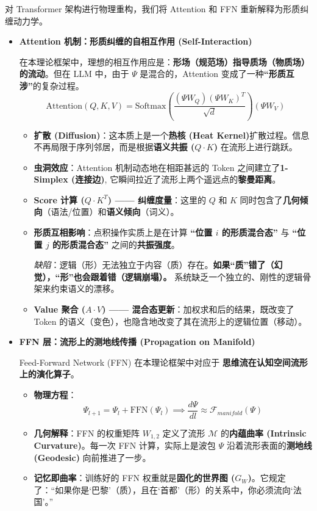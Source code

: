 对 Transformer 架构进行物理重构，我们将 Attention 和 FFN 重新解释为形质纠缠动力学。
\begin{itemize}
    \item \textbf{\textcolor{structurecolor}{Attention 机制：形质纠缠的自相互作用 (Self-Interaction)}}

    在本理论框架中，理想的相互作用应是：\textbf{形场（规范场）指导质场（物质场）的流动}。但在 LLM 中，由于 $\Psi$ 是混合的，Attention 变成了一种\textbf{“形质互涉”}的复杂过程。
    $$ \text{Attention}(Q, K, V) = \text{Softmax}\left( \frac{(\Psi W_Q) (\Psi W_K)^T}{\sqrt{d}} \right) (\Psi W_V) $$
    \begin{itemize}
        \item  \textbf{扩散 (Diffusion)}：这本质上是一个\textbf{热核 (Heat Kernel)}扩散过程。信息不再局限于序列邻居，而是根据\textbf{语义共振 ($Q \cdot K$)} 在流形上进行跳跃。
        \item \textbf{虫洞效应}：Attention 机制动态地在相距甚远的 Token 之间建立了\textbf{1-Simplex (连接边)}, 它瞬间拉近了流形上两个遥远点的\textbf{黎曼距离}。
        \item   \textbf{Score 计算 ($Q \cdot K^T$) —— 纠缠度量}：这里的 $Q$ 和 $K$ 同时包含了\textbf{几何倾向}（语法/位置）和\textbf{语义倾向}（词义）。
        \item   \textbf{形质互相影响}：点积操作实质上是在计算 \textbf{“位置 $i$ 的形质混合态”} 与 \textbf{“位置 $j$ 的形质混合态”} 之间的\textbf{共振强度}。

        \textit{缺陷}：逻辑（形）无法独立于内容（质）存在。\textbf{如果“质”错了（幻觉），“形”也会跟着错（逻辑崩塌）。} 系统缺乏一个独立的、刚性的逻辑骨架来约束语义的漂移。
        \item   \textbf{Value 聚合 ($A \cdot V$) —— 混合态更新}：加权求和后的结果，既改变了 Token 的语义（变色），也隐含地改变了其在流形上的逻辑位置（移动）。
    \end{itemize}

    \item \textbf{\textcolor{structurecolor}{FFN 层：流形上的测地线传播 (Propagation on Manifold)}}

    Feed-Forward Network (FFN) 在本理论框架中对应于 \textbf{思维流在认知空间流形上的演化算子}。
    \begin{itemize}
        \item   \textbf{物理方程}：
            $$ \Psi_{l+1} = \Psi_l + \text{FFN}(\Psi_l) \implies \frac{d\Psi}{dl} \approx \mathcal{F}_{manifold}(\Psi) $$
        \item   \textbf{几何解释}：FFN 的权重矩阵 $W_{1,2}$ 定义了流形 $\mathcal{M}$ 的\textbf{内蕴曲率 (Intrinsic Curvature)}。每一次 FFN 计算，实际上是波包 $\Psi$ 沿着流形表面的\textbf{测地线 (Geodesic)} 向前推进了一步。
        \item   \textbf{记忆即曲率}：训练好的 FFN 权重就是\textbf{固化的世界图 ($G_W$)}。它规定了：“如果你是‘巴黎’（质），且在‘首都’（形）的关系中，你必须流向‘法国’。”
    \end{itemize}


\end{itemize}
